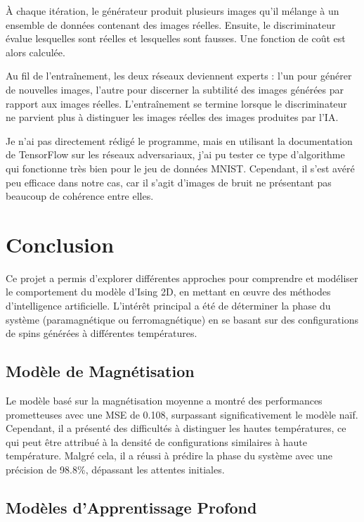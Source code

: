 \documentclass[11pt, parskip=half]{scrartcl} %
\begin{document}
À chaque itération, le générateur produit plusieurs images qu'il mélange à un ensemble de données contenant des images réelles. Ensuite, le discriminateur évalue lesquelles sont réelles et lesquelles sont fausses. Une fonction de coût est alors calculée.

Au fil de l'entraînement, les deux réseaux deviennent experts : l'un pour générer de nouvelles images, l'autre pour discerner la subtilité des images générées par rapport aux images réelles. L'entraînement se termine lorsque le discriminateur ne parvient plus à distinguer les images réelles des images produites par l'IA.

Je n'ai pas directement rédigé le programme, mais en utilisant la documentation de TensorFlow sur les réseaux adversariaux, j'ai pu tester ce type d'algorithme qui fonctionne très bien pour le jeu de données MNIST. Cependant, il s'est avéré peu efficace dans notre cas, car il s'agit d'images de bruit ne présentant pas beaucoup de cohérence entre elles.


\newpage
{}
\section*{Conclusion}

Ce projet a permis d'explorer différentes approches pour comprendre et modéliser le comportement du modèle d'Ising 2D, en mettant en œuvre des méthodes d'intelligence artificielle. L'intérêt principal a été de déterminer la phase du système (paramagnétique ou ferromagnétique) en se basant sur des configurations de spins générées à différentes températures.

\subsection*{Modèle de Magnétisation}

Le modèle basé sur la magnétisation moyenne a montré des performances prometteuses avec une MSE de 0.108, surpassant significativement le modèle naïf. Cependant, il a présenté des difficultés à distinguer les hautes températures, ce qui peut être attribué à la densité de configurations similaires à haute température. Malgré cela, il a réussi à prédire la phase du système avec une précision de 98.8\%, dépassant les attentes initiales.

\subsection*{Modèles d'Apprentissage Profond}
\end{document}

